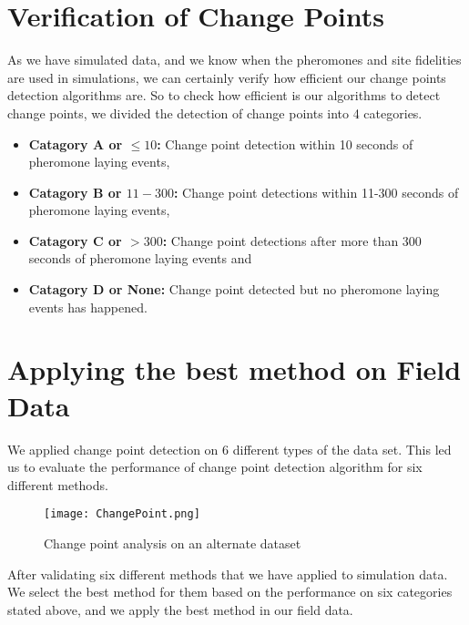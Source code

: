 \section{\label{section:Verification of Change Points}Verification of Change Points}
As we have simulated data, and we know when the pheromones and site fidelities are used in simulations, we can certainly verify how efficient our change points detection algorithms are. So to check how efficient is our algorithms to detect change points, we divided the detection of change points into 4 categories.
\begin{itemize}
	\item \textbf{Catagory A or $\le 10$:} Change point detection within 10 seconds of pheromone laying events, 
	\item \textbf{Catagory B or $11-300$:} Change point detections within 11-300 seconds of pheromone laying events, 
	\item \textbf{Catagory C or $>300$:} Change point detections after more than 300 seconds of pheromone laying events and 
	\item \textbf{Catagory D or None:} Change point detected but no pheromone laying events has happened. 
\end{itemize} 
\clearpage
\section{\label{section:Applying the best method on Field Data}Applying the best method on Field Data}
We applied change point detection on 6 different types of the data set. This led us to evaluate the performance of change point detection algorithm for six different methods.
\begin{figure}[!ht]
	\texttt{[image: ChangePoint.png]}
	\caption{Change point analysis on an alternate dataset}
\end{figure}
After validating six different methods that we have applied to simulation data. We select the best method for them based on the performance on six categories stated above, and we apply the best method in our field data.   

